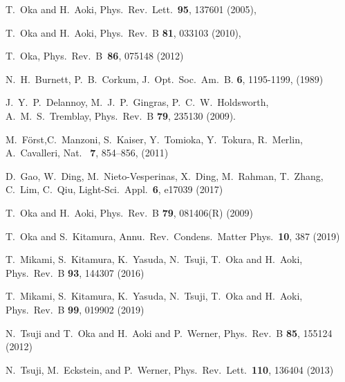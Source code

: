 \documentclass[prb,aps,twocolumn,showpacs,amsmath,amssymb]{revtex4}%
\begin{document}
\begin{thebibliography}{99}
T.\ Oka and H.\ Aoki, 
Phys.\ Rev.\ Lett.\ {\bf 95}, 137601 (2005),

T.\ Oka and H.\ Aoki, 
Phys.\ Rev.\ B {\bf 81}, 033103 (2010),

  T.\ Oka,
  Phys.\ Rev.\ B\ {\bf 86}, 075148 (2012)
 
  N.\ H.\ Burnett, P.\ B.\ Corkum, 
  J.\ Opt.\ Soc.\ Am.\ B.  {\bf 6}, 1195-1199, (1989)
  
  J.\ Y.\ P.\ Delannoy,  M.\ J.\ P.\ Gingras, P.\ C.\ W.\ Holdsworth, A.\ M.\ S.\ Tremblay, 
  Phys.\ Rev.\ B {\bf 79}, 235130 (2009).
  
  M.\ F\"orst,C.\ Manzoni, S.\ Kaiser, Y.\ Tomioka, Y.\ Tokura, R.\ Merlin, A.\ Cavalleri,
  Nat. \ {\bf 7}, 854–856, (2011)
 
   D.\ Gao, W.\ Ding, M.\ Nieto-Vesperinas, X.\ Ding, M.\ Rahman, T.\ Zhang, C.\ Lim, C.\ Qiu,
   Light-Sci.\ Appl.\ {\bf 6}, e17039 (2017)

   T.\ Oka and H.\ Aoki, 
   Phys.\ Rev.\ B {\bf 79}, 081406(R) (2009)
   
   
   T.\ Oka and S.\ Kitamura, 
   Annu.\ Rev.\ Condens.\ Matter Phys.\ {\bf 10}, 387 (2019)

T.\ Mikami, S.\ Kitamura, K.\ Yasuda, N.\ Tsuji, T.\ Oka and H.\ Aoki, 
Phys.\ Rev.\ B {\bf 93}, 144307 (2016)

T.\ Mikami, S.\ Kitamura, K.\ Yasuda, N.\ Tsuji, T.\ Oka and H.\ Aoki, 
Phys.\ Rev.\ B {\bf 99}, 019902 (2019)


N.\ Tsuji and T.\ Oka and H.\ Aoki and P.\ Werner,
 Phys.\ Rev.\ B {\bf 85}, 155124 (2012)
 
 N.\ Tsuji, M.\ Eckstein, and P.\ Werner, 
 Phys.\ Rev.\ Lett.\ {\bf 110}, 136404 (2013)


 \end{thebibliography}
\end{document}
